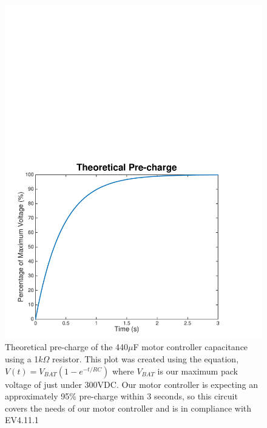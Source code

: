 \documentclass{article}
\begin{document}
\begin{figure}[H]
    \centering
    \includegraphics[width = 0.8 \textwidth]{precharge_voltage}
    \caption{Theoretical pre-charge of the 440$\mu$F motor controller capacitance using a 1$k\Omega$ resistor. This plot was created using the equation, $V(t) = V_{BAT}(1 - e^{-t/RC})$ where $V_{BAT}$ is our maximum pack voltage of just under 300VDC. Our motor controller is expecting an approximately 95\% pre-charge within 3 seconds, so this circuit covers the needs of our motor controller and is in compliance with EV4.11.1 }
    \label{fig:precharge_voltage}
\end{figure}
\end{document}
